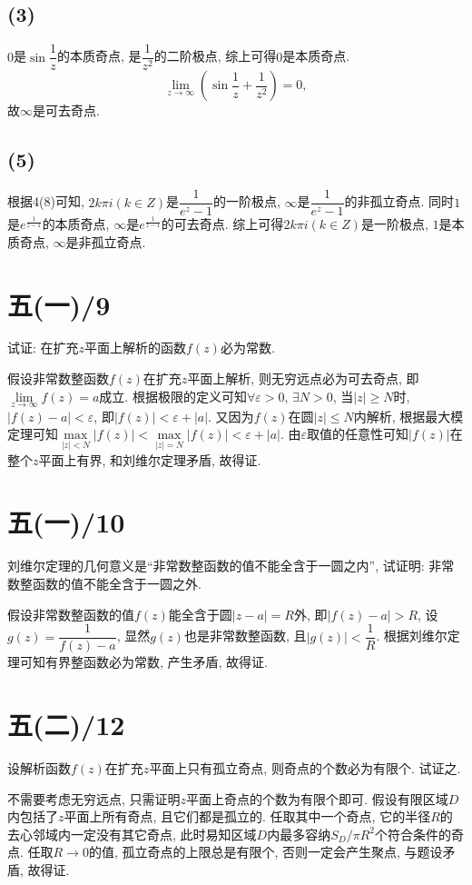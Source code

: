 \documentclass[11pt,a4paper]{article}
\begin{document}
\subsection*{(3)}
$0$是$\sin\dfrac{1}{z}$的本质奇点, 是$\dfrac{1}{z^2}$的二阶极点, 综上可得$0$是本质奇点.
$$\lim_{z\to\infty}\left(\sin\frac{1}{z}+\frac{1}{z^2}\right)=0,$$
故$\infty$是可去奇点.

\subsection*{(5)}
根据4(8)可知, $2k\pi i(k\in Z)$是$\dfrac{1}{e^z-1}$的一阶极点, $\infty$是$\dfrac{1}{e^z-1}$的非孤立奇点. 同时$1$是$e^{\frac{1}{z-1}}$的本质奇点, $\infty$是$e^{\frac{1}{z-1}}$的可去奇点. 综上可得$2k\pi i(k\in Z)$是一阶极点, $1$是本质奇点, $\infty$是非孤立奇点.

\section{五(一)/9}
\begin{problem}
试证: 在扩充$z$平面上解析的函数$f(z)$必为常数.
\end{problem}
假设非常数整函数$f(z)$在扩充$z$平面上解析, 则无穷远点必为可去奇点, 即$\lim\limits_{z\to\infty}f(z)=a$成立. 根据极限的定义可知$\forall\varepsilon>0$, $\exists N>0$, 当$|z|\geqslant N$时, $|f(z)-a|<\varepsilon$, 即$|f(z)|<\varepsilon+|a|$. 又因为$f(z)$在圆$|z|\leqslant N$内解析, 根据最大模定理可知$\max\limits_{|z|< N}|f(z)|<\max\limits_{|z|=N}|f(z)|<\varepsilon+|a|$.
由$\varepsilon$取值的任意性可知$|f(z)|$在整个$z$平面上有界, 和刘维尔定理矛盾, 故得证.

\section{五(一)/10}
\begin{problem}
刘维尔定理的几何意义是``非常数整函数的值不能全含于一圆之内'', 试证明: 非常数整函数的值不能全含于一圆之外.
\end{problem}
假设非常数整函数的值$f(z)$能全含于圆$|z-a|=R$外, 即$|f(z)-a|>R$, 设$g(z)=\dfrac{1}{f(z)-a}$, 显然$g(z)$也是非常数整函数, 且$|g(z)|<\dfrac{1}{R}$. 根据刘维尔定理可知有界整函数必为常数, 产生矛盾, 故得证.

\section{五(二)/12}
\begin{problem}
设解析函数$f(z)$在扩充$z$平面上只有孤立奇点, 则奇点的个数必为有限个. 试证之.
\end{problem}
不需要考虑无穷远点, 只需证明$z$平面上奇点的个数为有限个即可. 假设有限区域$D$内包括了$z$平面上所有奇点, 且它们都是孤立的. 任取其中一个奇点, 它的半径$R$的去心邻域内一定没有其它奇点, 此时易知区域$D$内最多容纳$S_D/\pi R^2$个符合条件的奇点. 任取$R\to 0$的值, 孤立奇点的上限总是有限个, 否则一定会产生聚点, 与题设矛盾, 故得证.
\end{document}
